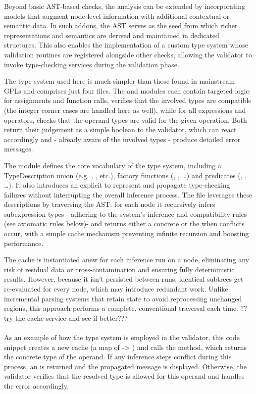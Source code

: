 Beyond basic AST-based checks, the analysis can be extended by incorporating models that augment node-level information with additional contextual or semantic data.
In such addons, the AST serves as the seed from which richer representations and semantics are derived and maintained in dedicated structures.
This also enables the implementation of a custom type system whose validation routines are registered alongside other checks, allowing the validator to
invoke type-checking services during the validation phase.

The type system used here is much simpler than those found in mainstream GPLs and comprises just four files. The  and 
modules each contain targeted logic: for assignments and function calls,  verifies that the involved types are compatible (the integer corner cases are handled here as well),
while for all expressions and operators,  checks that the operand types are valid for the given operation. Both return their judgement as a simple boolean to
the validator, which can react accordingly and - already aware of the involved types - produce detailed error messages.

The  module defines the core vocabulary of the type system, including a TypeDescription union (e.g. , , etc.),
factory functions (, , …) and predicates (, , …). It also introduces an explicit
 to represent and propagate type-checking failures without interrupting the overall inference process. The  file leverages these
descriptions by traversing the AST: for each node it recursively infers subexpression types - adhering to the system's inference and compatibility rules (see axiomatic rules below)-
and returns either a concrete  or the  when conflicts occur, with a simple cache mechanism preventing infinite recursion and boosting performance.

The cache is instantiated anew for each inference run on a node, eliminating any risk of residual data or cross-contamination and ensuring fully deterministic results.
However, because it isn't persisted between runs, identical subtrees get re-evaluated for every node, which may introduce redundant work.
Unlike incremental parsing systems that retain state to avoid reprocessing unchanged regions, this approach performs a complete, conventional traversal each time.
??try the cache service and see if better???
\\
\\
As an example of how the type system is employed in the validator, this code snippet creates a new cache (a map of  -> ) and calls the
 method, which returns the concrete type of the operand. If any inference steps conflict during this process, an  is returned and the
propagated message is displayed. Otherwise, the validator verifies that the resolved type is allowed for this operand and handles the error accordingly.

